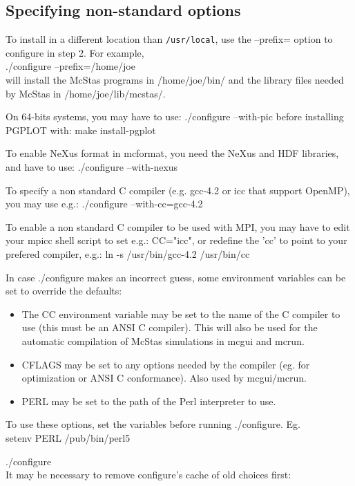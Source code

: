 \subsection{Specifying non-standard options}
To install in a different location than \texttt{/usr/local}, use the --prefix= option to
configure in step 2. For example,\\

  ./configure --prefix=/home/joe\\

\noindent will install the McStas programs in /home/joe/bin/ and the
library files needed by McStas in /home/joe/lib/mcstas/.

\noindent On 64-bits systems, you may have to use: ./configure --with-pic before installing PGPLOT with: make install-pgplot

\noindent To enable NeXus format in mcformat, you need the NeXus and HDF libraries, and have to use: ./configure --with-nexus

\noindent To specify a non standard C compiler (e.g. gcc-4.2 or icc that support OpenMP), you may use e.g.: ./configure --with-cc=gcc-4.2

\noindent To enable a non standard C compiler to be used with MPI, you may have to edit your mpicc shell script to set e.g.: CC="icc", or redefine the 'cc' to point to your prefered compiler, e.g.: ln -s /usr/bin/gcc-4.2 /usr/bin/cc

In case ./configure makes an incorrect guess, some environment variables
can be set to override the defaults:
\begin{itemize}
\item{The CC environment variable may be set to the name of the C compiler
   to use (this must be an ANSI C compiler). This will also be used for
   the automatic compilation of McStas simulations in mcgui and
   mcrun.}
\item{CFLAGS may be set to any options needed by the compiler (eg. for
   optimization or ANSI C conformance). Also used by mcgui/mcrun.}
\item{PERL may be set to the path of the Perl interpreter to use.}
\end{itemize}
\noindent To use these options, set the variables before running ./configure. Eg.\\

    setenv PERL /pub/bin/perl5

    ./configure\\

\noindent It may be necessary to remove configure's cache of old
choices first:\\


